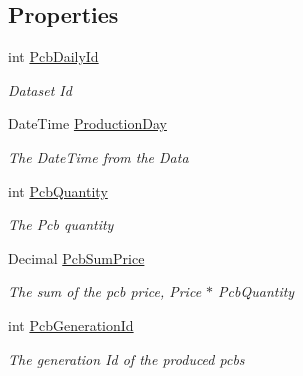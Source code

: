 \subsection*{Properties}
\begin{DoxyCompactItemize}
\item 
int \hyperlink{classkpi_mvc_api_1_1_data_transfer_objects_1_1_production_data_dto_ab24ad8f116be3df889f6309e3b91f3a9}{Pcb\+Daily\+Id}
\begin{DoxyCompactList}\small\item\em Dataset Id \end{DoxyCompactList}\item 
Date\+Time \hyperlink{classkpi_mvc_api_1_1_data_transfer_objects_1_1_production_data_dto_a9a9631598c932f090384ec903880ca67}{Production\+Day}
\begin{DoxyCompactList}\small\item\em The Date\+Time from the Data \end{DoxyCompactList}\item 
int \hyperlink{classkpi_mvc_api_1_1_data_transfer_objects_1_1_production_data_dto_a3408775cae304e2a6cd4c5b552c3297c}{Pcb\+Quantity}
\begin{DoxyCompactList}\small\item\em The Pcb quantity \end{DoxyCompactList}\item 
Decimal \hyperlink{classkpi_mvc_api_1_1_data_transfer_objects_1_1_production_data_dto_a768d34bc3027bf583498fa08ee235e0c}{Pcb\+Sum\+Price}
\begin{DoxyCompactList}\small\item\em The sum of the pcb price, Price $\ast$ Pcb\+Quantity \end{DoxyCompactList}\item 
int \hyperlink{classkpi_mvc_api_1_1_data_transfer_objects_1_1_production_data_dto_a2e933cf5f6b7ff45d576328969e0c36e}{Pcb\+Generation\+Id}
\begin{DoxyCompactList}\small\item\em The generation Id of the produced pcbs \end{DoxyCompactList}\item 

\end{DoxyCompactItemize}
